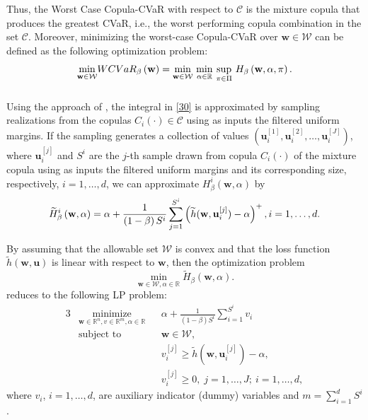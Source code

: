\documentclass[a4paper,10pt]{article}
\begin{document}
Thus, the Worst Case Copula-CVaR with respect to $\mathcal{C}$ is the mixture copula that produces the greatest CVaR, i.e., the worst performing copula combination in the set $\mathcal{C}$. Moreover, minimizing the worst-case Copula-CVaR over $\mathbf{w}\in \mathcal{W}$ can be defined as the following optimization problem:
\begin{equation}
\underset{\mathbf{w}\in \mathcal{W}}{\min }WCVaR_{\beta }\left( \mathbf{w}%
\right) =\underset{}{\underset{\mathbf{w}\in \mathcal{W}}{\min }~\underset{%
		\alpha \in	\mathbb{R}}{\min }~\underset{\pi \in \Pi }{\sup }}~H_{\beta }\left( \mathbf{w},\alpha,\pi \right).  \label{32}
\end{equation}

Using the approach of \citet*{rockafellar2000}, the integral in \eqref{30} is approximated by sampling realizations from the copulas $C_{i}\left( \cdot \right) \in \mathcal{C}$ using as inputs the filtered uniform margins. If the sampling generates a collection of values $\left(\mathbf{u}_{i}^{[1]},\mathbf{u}_{i}^{[2]},\ldots,\mathbf{u}_{i}^{[J]}\right)$,
where $\mathbf{u}_{i}^{[j]}$ and $S^{i}$ are the $j$-th sample drawn from copula $C_{i}\left( \cdot \right) $ of the mixture copula using as inputs the filtered uniform margins and its corresponding size, respectively, $i=1,\ldots,d$, we can approximate $H_{\beta }^{i}\left( \mathbf{w},\alpha\right)$ by
\begin{equation}
\widetilde{H}_{\beta }^{i}\left( \mathbf{w},\alpha \right) =\alpha +\frac{1}{%
	\left( 1-\beta \right) S^{i}}\sum_{j=1}^{S^{i}}\left( \widetilde{h}(\mathbf{w},\mathbf{u}%
_{i}^{[j]})-\alpha \right) ^{+},i=1,\ldots,d.
\end{equation}%

By assuming that the allowable set $\mathcal{W}$ is convex and that the loss function $\widetilde{h}\left( \mathbf{w,u}\right) $ is linear with respect to $\mathbf{w}$, then the optimization problem
\begin{equation}
\underset{\mathbf{w}\in \mathcal{W},\alpha \in
	\mathbb{R}
}{\min }\widetilde{H}_{\beta }\left( \mathbf{w},\alpha \right) .
\end{equation}%
reduces to the following LP problem:
\begin{alignat}{3}
& \underset{\mathbf{w}\in
	\mathbb{R}^{n},v\in
	\mathbb{R}^{m},\alpha \in
	\mathbb{R}}{\text{minimize}}
& & \alpha +\frac{1}{\left( 1-\beta \right)  S^{i}}\sum_{i=1}^{S^{i}}v_{i}
\\ 
& \text{subject to} 
& & \mathbf{w}\in \mathcal{W},\\
&&& v_{i}^{\left[ j\right] }\geq \widetilde{h}(\mathbf{w},\mathbf{u}_{i}^{[j]})-\alpha , \\
&&&v_{i}^{\left[ j\right] }\geq 0, \; j = 1, \ldots, J; \ i = 1, \ldots, d,
\end{alignat}
where $v_{i}$, $i = 1, \ldots, d$, are auxiliary indicator (dummy) variables and $m=\sum_{i=1}^{d}S^{i}$. 
\end{document}
